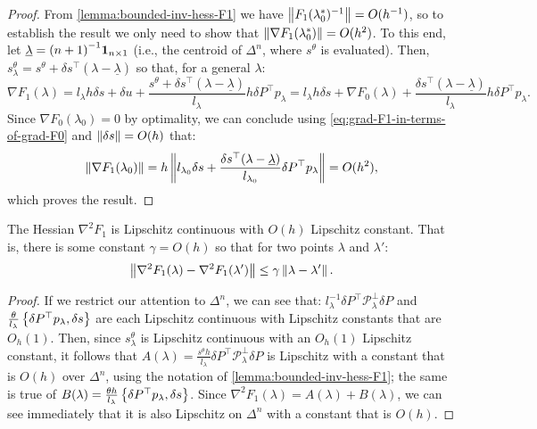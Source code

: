 \documentclass[eikonal.tex]{subfiles}
\begin{document}
\begin{proof}
  From \cref{lemma:bounded-inv-hess-F1} we have
  $\left\|F_1(\lambda_0^*)^{-1}\right\| = O(h^{-1})$, so to establish the
  result we only need to show that
  $\left\|\nabla F_1(\lambda_0^*)\right\| = O(h^2)$. To this end, let
  $\underline{\lambda} = {(n + 1)}^{-1} \boldsymbol{1}_{n \times 1}$ (i.e., the
  centroid of $\Delta^n$, where $s^\theta$ is evaluated). Then,
  $s^\theta_\lambda = s^\theta + \delta s^\top (\lambda -
  \underline{\lambda})$ so that, for a general $\lambda$:
  \begin{equation}
    \label{eq:grad-F1-in-terms-of-grad-F0}
    \nabla F_1(\lambda) = l_\lambda h \delta s + \delta u + \frac{s^\theta + \delta s^\top (\lambda - \underline{\lambda})}{l_\lambda} h \delta P^\top p_\lambda = l_\lambda h \delta s + \nabla F_0(\lambda) + \frac{\delta s^\top {(\lambda - \underline{\lambda})}}{l_\lambda} h \delta P^\top p_\lambda.
  \end{equation}
  Since $\nabla F_0(\lambda_0) = 0$ by optimality, we can conclude
  using \cref{eq:grad-F1-in-terms-of-grad-F0} and
  $\left\|\delta s\right\| = O(h)$ that:
  \begin{equation}
    \left\|\nabla F_1(\lambda_0)\right\| = h \left\|l_{\lambda_0} \delta s + \frac{\delta s^\top {(\lambda - \underline{\lambda})}}{l_{\lambda_0}} \delta P^\top p_\lambda\right\| = O(h^2),
  \end{equation}
  which proves the result.
\end{proof}

\begin{lemma}\label{lemma:hess-F1-lipschitz}
  The Hessian $\nabla^2 F_1$ is Lipschitz continuous with $O(h)$
  Lipschitz constant. That is, there is some constant $\gamma = O(h)$
  so that for two points $\lambda$ and $\lambda'$:
  \begin{align*}
    \left\|\nabla^2 F_1(\lambda) - \nabla^2 F_1(\lambda')\right\| \leq \gamma \left\|\lambda - \lambda'\right\|.
  \end{align*}
\end{lemma}

\begin{proof}
  If we restrict our attention to $\Delta^n$, we can see that:
  $l_\lambda^{-1} \delta P^\top \mathcal{P}_\lambda^\perp \delta P$
  and
  $\tfrac{\theta}{l_\lambda} \left\{\delta P^\top p_\lambda, \delta
    s\right\}$ are each Lipschitz continuous with Lipschitz constants that
  are $O_h(1)$. Then, since $s^\theta_\lambda$ is Lipschitz continuous
  with an $O_h(1)$ Lipschitz constant, it follows that
  $A(\lambda) = \tfrac{s^\theta h}{l_\lambda} \delta P^\top
  \mathcal{P}^\perp_\lambda \delta P$ is Lipschitz with a constant
  that is $O(h)$ over $\Delta^n$, using the notation of
  \cref{lemma:bounded-inv-hess-F1}; the same is true of
  $B(\lambda) = \tfrac{\theta h}{l_\lambda} \left\{\delta P^\top
    p_\lambda, \delta s\right\}$. Since
  $\nabla^2 F_1(\lambda) = A(\lambda) + B(\lambda)$, we can see
  immediately that it is also Lipschitz on $\Delta^n$ with a constant
  that is $O(h)$.
\end{proof}
\end{document}

